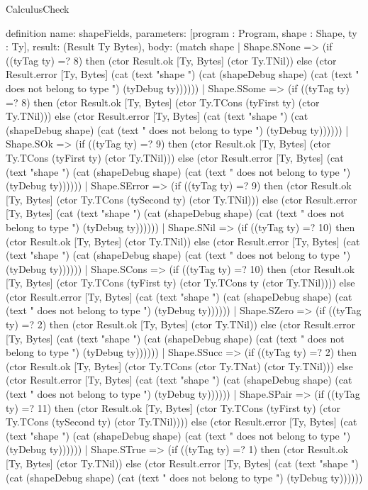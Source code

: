 \begin{lexlean}{CalculusCheck}
\begin{semanticmodule}
definition{
  name: shapeFields,
  parameters: [program : Program, shape : Shape, ty : Ty],
  result: (Result Ty Bytes),
  body: (match shape
    | Shape.SNone => (if ((tyTag ty) =? 8) then (ctor Result.ok [Ty, Bytes] (ctor Ty.TNil)) else (ctor Result.error [Ty, Bytes] (cat (text "shape ") (cat (shapeDebug shape) (cat (text " does not belong to type ") (tyDebug ty))))))
    | Shape.SSome => (if ((tyTag ty) =? 8) then (ctor Result.ok [Ty, Bytes] (ctor Ty.TCons (tyFirst ty) (ctor Ty.TNil))) else (ctor Result.error [Ty, Bytes] (cat (text "shape ") (cat (shapeDebug shape) (cat (text " does not belong to type ") (tyDebug ty))))))
    | Shape.SOk => (if ((tyTag ty) =? 9) then (ctor Result.ok [Ty, Bytes] (ctor Ty.TCons (tyFirst ty) (ctor Ty.TNil))) else (ctor Result.error [Ty, Bytes] (cat (text "shape ") (cat (shapeDebug shape) (cat (text " does not belong to type ") (tyDebug ty))))))
    | Shape.SError => (if ((tyTag ty) =? 9) then (ctor Result.ok [Ty, Bytes] (ctor Ty.TCons (tySecond ty) (ctor Ty.TNil))) else (ctor Result.error [Ty, Bytes] (cat (text "shape ") (cat (shapeDebug shape) (cat (text " does not belong to type ") (tyDebug ty))))))
    | Shape.SNil => (if ((tyTag ty) =? 10) then (ctor Result.ok [Ty, Bytes] (ctor Ty.TNil)) else (ctor Result.error [Ty, Bytes] (cat (text "shape ") (cat (shapeDebug shape) (cat (text " does not belong to type ") (tyDebug ty))))))
    | Shape.SCons => (if ((tyTag ty) =? 10) then (ctor Result.ok [Ty, Bytes] (ctor Ty.TCons (tyFirst ty) (ctor Ty.TCons ty (ctor Ty.TNil)))) else (ctor Result.error [Ty, Bytes] (cat (text "shape ") (cat (shapeDebug shape) (cat (text " does not belong to type ") (tyDebug ty))))))
    | Shape.SZero => (if ((tyTag ty) =? 2) then (ctor Result.ok [Ty, Bytes] (ctor Ty.TNil)) else (ctor Result.error [Ty, Bytes] (cat (text "shape ") (cat (shapeDebug shape) (cat (text " does not belong to type ") (tyDebug ty))))))
    | Shape.SSucc => (if ((tyTag ty) =? 2) then (ctor Result.ok [Ty, Bytes] (ctor Ty.TCons (ctor Ty.TNat) (ctor Ty.TNil))) else (ctor Result.error [Ty, Bytes] (cat (text "shape ") (cat (shapeDebug shape) (cat (text " does not belong to type ") (tyDebug ty))))))
    | Shape.SPair => (if ((tyTag ty) =? 11) then (ctor Result.ok [Ty, Bytes] (ctor Ty.TCons (tyFirst ty) (ctor Ty.TCons (tySecond ty) (ctor Ty.TNil)))) else (ctor Result.error [Ty, Bytes] (cat (text "shape ") (cat (shapeDebug shape) (cat (text " does not belong to type ") (tyDebug ty))))))
    | Shape.STrue => (if ((tyTag ty) =? 1) then (ctor Result.ok [Ty, Bytes] (ctor Ty.TNil)) else (ctor Result.error [Ty, Bytes] (cat (text "shape ") (cat (shapeDebug shape) (cat (text " does not belong to type ") (tyDebug ty))))))
}
\end{semanticmodule}
\end{lexlean}
